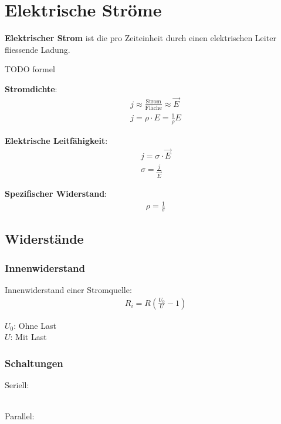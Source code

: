 \section{Elektrische Ströme}

\textbf{Elektrischer Strom} ist die pro Zeiteinheit durch einen elektrischen Leiter
fliessende Ladung.

TODO formel

\textbf{Stromdichte}:
\begin{align*}
	& j \approx \frac{\textrm{Strom}}{\textrm{Fläche}} \approx \vec{E} \\
	& j = \rho \cdot E = \frac{1}{\rho}E
\end{align*}

\textbf{Elektrische Leitfähigkeit}:
\begin{align*}
	& j = \sigma \cdot \vec{E} \\
	& \sigma = \frac{j}{\vec{E}}
\end{align*}

\textbf{Spezifischer Widerstand}:
\begin{align*}
	& \rho = \frac{1}{\sigma}
\end{align*}

\subsection{Widerstände}

\subsubsection{Innenwiderstand}

Innenwiderstand einer Stromquelle:
\begin{align*}
	& R_i = R \left(\frac{U_0}{U} - 1\right)
\end{align*}

$U_0$: Ohne Last\\
$U$: Mit Last

\subsubsection{Schaltungen}

\begin{minipage}[t]{.5\linewidth}
	Seriell:\\\\
	
\end{minipage}
\begin{minipage}[t]{.5\linewidth}
	Parallel:\\\\
	
\end{minipage}


